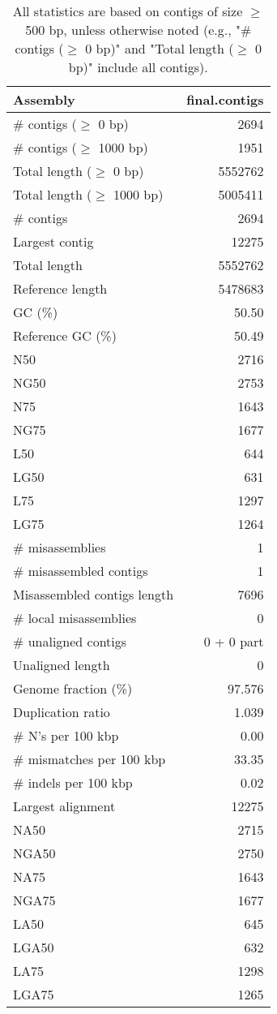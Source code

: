 \documentclass[12pt,a4paper]{article}
\begin{document}
\begin{table}[ht]
\begin{center}
\caption{All statistics are based on contigs of size $\geq$ 500 bp, unless otherwise noted (e.g., "\# contigs ($\geq$ 0 bp)" and "Total length ($\geq$ 0 bp)" include all contigs).}
\begin{tabular}{|l*{1}{|r}|}
\hline
Assembly & final.contigs \\ \hline
\# contigs ($\geq$ 0 bp) & 2694 \\ \hline
\# contigs ($\geq$ 1000 bp) & 1951 \\ \hline
Total length ($\geq$ 0 bp) & 5552762 \\ \hline
Total length ($\geq$ 1000 bp) & 5005411 \\ \hline
\# contigs & 2694 \\ \hline
Largest contig & 12275 \\ \hline
Total length & 5552762 \\ \hline
Reference length & 5478683 \\ \hline
GC (\%) & 50.50 \\ \hline
Reference GC (\%) & 50.49 \\ \hline
N50 & 2716 \\ \hline
NG50 & 2753 \\ \hline
N75 & 1643 \\ \hline
NG75 & 1677 \\ \hline
L50 & 644 \\ \hline
LG50 & 631 \\ \hline
L75 & 1297 \\ \hline
LG75 & 1264 \\ \hline
\# misassemblies & 1 \\ \hline
\# misassembled contigs & 1 \\ \hline
Misassembled contigs length & 7696 \\ \hline
\# local misassemblies & 0 \\ \hline
\# unaligned contigs & 0 + 0 part \\ \hline
Unaligned length & 0 \\ \hline
Genome fraction (\%) & 97.576 \\ \hline
Duplication ratio & 1.039 \\ \hline
\# N's per 100 kbp & 0.00 \\ \hline
\# mismatches per 100 kbp & 33.35 \\ \hline
\# indels per 100 kbp & 0.02 \\ \hline
Largest alignment & 12275 \\ \hline
NA50 & 2715 \\ \hline
NGA50 & 2750 \\ \hline
NA75 & 1643 \\ \hline
NGA75 & 1677 \\ \hline
LA50 & 645 \\ \hline
LGA50 & 632 \\ \hline
LA75 & 1298 \\ \hline
LGA75 & 1265 \\ \hline
\end{tabular}
\end{center}
\end{table}
\end{document}
